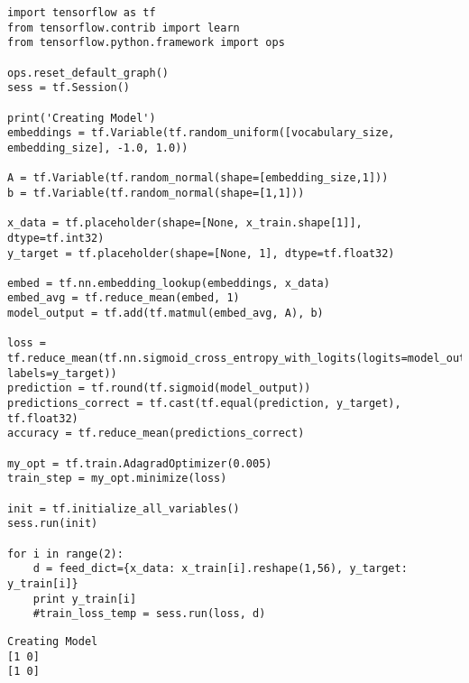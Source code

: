 \documentclass[12pt,fleqn]{article}\usepackage{../../common}
\begin{document}
\begin{verbatim}
import tensorflow as tf
from tensorflow.contrib import learn
from tensorflow.python.framework import ops

ops.reset_default_graph()
sess = tf.Session()

print('Creating Model')
embeddings = tf.Variable(tf.random_uniform([vocabulary_size, embedding_size], -1.0, 1.0))

A = tf.Variable(tf.random_normal(shape=[embedding_size,1]))
b = tf.Variable(tf.random_normal(shape=[1,1]))

x_data = tf.placeholder(shape=[None, x_train.shape[1]], dtype=tf.int32)
y_target = tf.placeholder(shape=[None, 1], dtype=tf.float32)

embed = tf.nn.embedding_lookup(embeddings, x_data)
embed_avg = tf.reduce_mean(embed, 1)
model_output = tf.add(tf.matmul(embed_avg, A), b)

loss = tf.reduce_mean(tf.nn.sigmoid_cross_entropy_with_logits(logits=model_output, labels=y_target))
prediction = tf.round(tf.sigmoid(model_output))
predictions_correct = tf.cast(tf.equal(prediction, y_target), tf.float32)
accuracy = tf.reduce_mean(predictions_correct)

my_opt = tf.train.AdagradOptimizer(0.005)
train_step = my_opt.minimize(loss)

init = tf.initialize_all_variables()
sess.run(init)

for i in range(2):
    d = feed_dict={x_data: x_train[i].reshape(1,56), y_target: y_train[i]}
    print y_train[i]
    #train_loss_temp = sess.run(loss, d)
\end{verbatim}

\begin{verbatim}
Creating Model
[1 0]
[1 0]
\end{verbatim}
\end{document}
